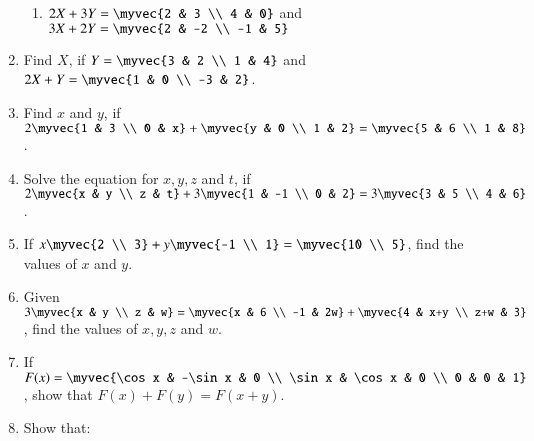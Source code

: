 \documentclass{article}
\theoremstyle{remark}
\begin{document}
\begin{enumerate}
\begin{enumerate}[label=(\roman*)]
\item $2X+3Y=\myvec
{2 & 3 \\ 4 & 0}$ and $3X+2Y=\myvec
{2 & -2 \\ -1 & 5}$
\end{enumerate}
\item Find $X$, if $Y=\myvec
{3 & 2 \\ 1 & 4}$  and $2X+Y=\myvec
{1 & 0 \\ -3 & 2}$.
\item Find $x$ and $y$, if $2 \myvec
{1 & 3 \\ 0 & x}+ \myvec
{y & 0 \\ 1 & 2}= \myvec
{5 & 6 \\ 1 & 8}$.
\item Solve the equation for $x, y, z$ and $t$, if $2 \myvec
{x & y \\ z & t} + 3 \myvec
{1 & -1 \\ 0 & 2} = 3 \myvec
{3 & 5 \\ 4 & 6}$.
\item If $x \myvec
{2 \\ 3} + y \myvec
{-1 \\ 1}= \myvec
{10 \\ 5}$, find the values of $x$ and $y$.
\item Given $3 \myvec
{x & y \\ z & w}=\myvec
{x & 6 \\ -1 & 2w}+ \myvec
{4 & x+y \\ z+w & 3}$, find the values of $x, y, z$ and $w$.
\item If $F(x)=\myvec
{\cos x & -\sin x & 0 \\ \sin x & \cos x & 0 \\ 0 & 0 & 1}$ , show that $F(x)+F(y)=F(x+y)$.
\item Show that:
\end{enumerate}
\end{document}
